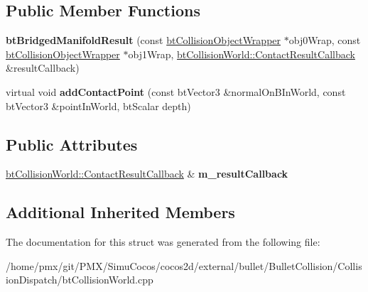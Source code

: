 \subsection*{Public Member Functions}
\begin{DoxyCompactItemize}
\item 
\mbox{\label{structbtBridgedManifoldResult_aa9f9786341735dd00f3c61f623885818}} 
{\bfseries bt\+Bridged\+Manifold\+Result} (const \hyperlink{structbtCollisionObjectWrapper}{bt\+Collision\+Object\+Wrapper} $\ast$obj0\+Wrap, const \hyperlink{structbtCollisionObjectWrapper}{bt\+Collision\+Object\+Wrapper} $\ast$obj1\+Wrap, \hyperlink{structbtCollisionWorld_1_1ContactResultCallback}{bt\+Collision\+World\+::\+Contact\+Result\+Callback} \&result\+Callback)
\item 
\mbox{\label{structbtBridgedManifoldResult_a9eb7dd871adfe2f4b6fc04f8687c88c1}} 
virtual void {\bfseries add\+Contact\+Point} (const bt\+Vector3 \&normal\+On\+B\+In\+World, const bt\+Vector3 \&point\+In\+World, bt\+Scalar depth)
\end{DoxyCompactItemize}
\subsection*{Public Attributes}
\begin{DoxyCompactItemize}
\item 
\mbox{\label{structbtBridgedManifoldResult_a50e4e29bc74ce91098590fa68ebc8c98}} 
\hyperlink{structbtCollisionWorld_1_1ContactResultCallback}{bt\+Collision\+World\+::\+Contact\+Result\+Callback} \& {\bfseries m\+\_\+result\+Callback}
\end{DoxyCompactItemize}
\subsection*{Additional Inherited Members}


The documentation for this struct was generated from the following file\+:\begin{DoxyCompactItemize}
\item 
/home/pmx/git/\+P\+M\+X/\+Simu\+Cocos/cocos2d/external/bullet/\+Bullet\+Collision/\+Collision\+Dispatch/bt\+Collision\+World.\+cpp\end{DoxyCompactItemize}
